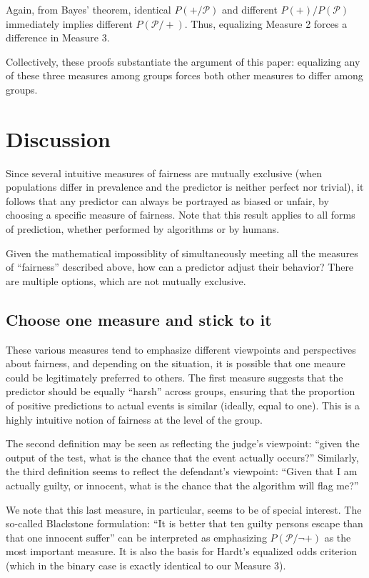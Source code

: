 \documentclass[twocolumn]{article}
\begin{document}
Again, from Bayes' theorem, identical $P(+/ \mathcal{P})$ and different $P(+)/P(\mathcal{P})$ immediately implies different $P(\mathcal{P}/+)$. Thus, equalizing Measure 2 forces a difference in Measure 3. 

Collectively, these proofs substantiate the argument of this paper: equalizing any of these three measures among groups forces both other measures to differ among groups.


\section{Discussion}

Since several intuitive measures of fairness are mutually exclusive (when populations differ in prevalence and the predictor is neither perfect nor trivial), it follows that any predictor can always be portrayed as biased or unfair, by choosing a specific measure of fairness. Note that this result applies to all forms of prediction, whether performed by algorithms or by humans.

Given the mathematical impossiblity of simultaneously meeting all the measures of
``fairness'' described above, how can a predictor adjust their behavior? There are multiple
options, which are not mutually exclusive.

\subsection{Choose one measure and stick to it} 

These various measures tend to emphasize different viewpoints and perspectives about fairness, and depending on the situation, it is possible that one meaure could be legitimately preferred to others.
The first measure suggests that the predictor should be equally ``harsh'' across groups, ensuring that the proportion of positive predictions to actual events is similar (ideally, equal to one). This is a highly intuitive notion of fairness at the level of the group.

The second definition may be seen as reflecting the judge's
viewpoint: ``given the output of the test, what is the chance that the event
actually occurs?'' Similarly, the third definition seems to reflect the
defendant's viewpoint: ``Given that I am actually guilty, or innocent, what is the chance that the algorithm will flag me?''

We note that this last measure, in particular, seems to be of special interest. The so-called Blackstone formulation: ``It is better that ten guilty persons escape than that one innocent suffer'' can be interpreted as emphasizing $P(\mathcal{P}/\neg+)$ as the most important measure. It is also the basis for Hardt's equalized odds criterion \cite{hardt2016equality} (which in the binary case is exactly identical to our Measure 3).
\end{document}
